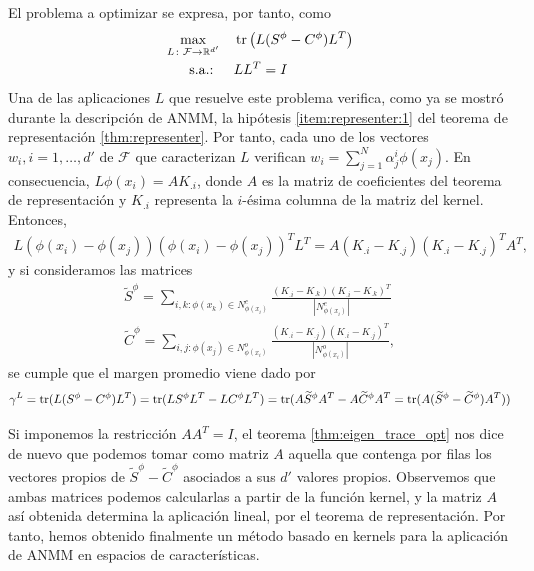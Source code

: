 \documentclass{book}
\begin{document}
El problema a optimizar se expresa, por tanto, como
\begin{align}
	\max_{L \colon \mathcal{F} \to \mathbb{R}^{d'}} &\quad \operatorname{tr}\left(L(S^{\phi}-C^{\phi})L^T\right)  \\
	\text{s.a.: } &\quad LL^T = I
\end{align}
Una de las aplicaciones $L$ que resuelve este problema verifica, como ya se mostró durante la descripción de ANMM, la hipótesis \ref{item:representer:1} del teorema de representación \ref{thm:representer}. Por tanto, cada uno de los vectores $w_i, i = 1,\dots,d'$ de $\mathcal{F}$ que caracterizan $L$ verifican $w_i = \sum_{j=1}^N \alpha_j^i \phi(x_j)$. En consecuencia, $L\phi(x_i) = AK_{.i}$, donde $A$ es la matriz de coeficientes del teorema de representación y $K_{.i}$ representa la $i$-ésima columna de la matriz del kernel. Entonces,
\begin{equation*}
	\begin{split}
		L(\phi(x_i)-\phi(x_j))(\phi(x_i)-\phi(x_j))^TL^T = A(K_{.i}-K_{.j})(K_{.i}-K_{.j})^TA^T,
	\end{split}
\end{equation*}
y si consideramos las matrices
\begin{align*}
	\widetilde{S}^{\phi} = \sum\limits_{i,k \colon \phi(x_k) \in N_{\phi(x_i)}^e} \frac{(K_{.i}-K_{.k})(K_{.i}-K_{.k})^T}{|N_{\phi(x_i)}^e|} \\
	\widetilde{C}^{\phi} = \sum\limits_{i,j \colon \phi(x_j) \in N_{\phi(x_i)}^o} \frac{(K_{.i}-K_{.j})(K_{.i}-K_{.j})^T}{|N_{\phi(x_i)}^o|},
\end{align*}
se cumple que el margen promedio viene dado por
\begin{equation*}
	\gamma^L = \operatorname{tr}(L(S^{\phi}-C^{\phi})L^T) = \operatorname{tr}(LS^{\phi}L^T-LC^{\phi}L^T) = \operatorname{tr}(A \widetilde{S}^{\phi} A^T - A\widetilde{C}^{\phi}A^T = \operatorname{tr}(A(\widetilde{S}^{\phi}-\widetilde{C}^{\phi})A^T))
\end{equation*} 

Si imponemos la restricción $AA^T = I$, el teorema \ref{thm:eigen_trace_opt} nos dice de nuevo que podemos tomar como matriz $A$ aquella que contenga por filas los vectores propios de $\widetilde{S}^{\phi}-\widetilde{C}^{\phi}$ asociados a sus $d'$ valores propios. Observemos que ambas matrices podemos calcularlas a partir de la función kernel, y la matriz $A$ así obtenida determina la aplicación lineal, por el teorema de representación. Por tanto, hemos obtenido finalmente un método basado en kernels para la aplicación de ANMM en espacios de características.
\end{document}
